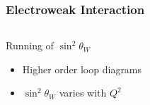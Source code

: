 \begin{frame}
 \frametitle{Electroweak Interaction}
 \begin{columns}
   \begin{block}{Running of $\sin^2 \theta_W$}
    \begin{itemize}
     \item Higher order loop diagrams
     \item $\sin^2 \theta_W$ varies with $Q^2$
    \end{itemize}
   \end{block}
 \end{columns}
 \begin{center}
  \begin{figure}
  \end{figure}
 \end{center}
\end{frame}
